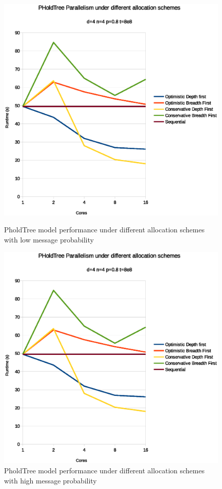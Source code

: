 \begin{figure}
	\center
	
	\includegraphics[width=\modelfraction\columnwidth]{fig/pholdtreealloclowp.eps}
	\caption{PholdTree model performance under different allocation schemes with low message probability}
	\label{fig:PholdTree_plot_alloc_low}
	
	\includegraphics[width=\modelfraction\columnwidth]{fig/pholdtreeallochighp.eps}
	\caption{PholdTree model performance under different allocation schemes with high message probability}
	\label{fig:PholdTree_plot_alloc_high}
\end{figure}

